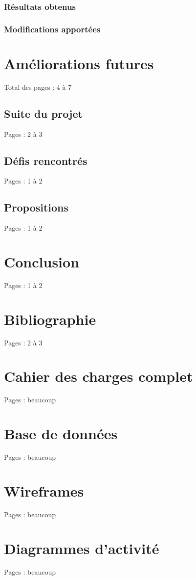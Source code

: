 \documentclass{eplmastersthesis_FR}
\begin{document}
			\subsection*{Résultats obtenus}
			\subsection*{Modifications apportées}

	\chapter{Améliorations futures}

		Total des pages : 4 à 7

		\section{Suite du projet}

			Pages : 2 à 3

		\section{Défis rencontrés}

			Pages : 1 à 2

		\section{Propositions}

			Pages : 1 à 2

	\chapter{Conclusion}

		Pages : 1 à 2

	\chapter*{Bibliographie}

		Pages : 2 à 3

	\appendix

	\chapter{Cahier des charges complet}

		Pages : beaucoup

	\chapter{Base de données}

		Pages : beaucoup

	\chapter{Wireframes}

		Pages : beaucoup

	\chapter{Diagrammes d'activité}

		Pages : beaucoup

	\setlength{\parskip}{0em}
	\backcoverpage
\end{document}
